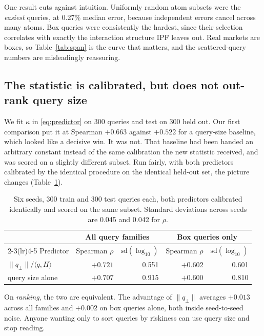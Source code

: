 \documentclass[11pt]{article}
\begin{document}
One result cuts against intuition. Uniformly random atom subsets were the
\emph{easiest} queries, at 0.27\% median error, because independent errors cancel
across many atoms. Box queries were consistently the hardest, since their
selection correlates with exactly the interaction structure IPF leaves out. Real
markets are boxes, so Table~\ref{tab:span} is the curve that matters, and the
scattered-query numbers are misleadingly reassuring.

\subsection{The statistic is calibrated, but does not out-rank query size}
\label{sec:calib}

We fit $\kappa$ in \eqref{eq:predictor} on 300 queries and test on 300 held out.
Our first comparison put it at Spearman $+0.663$ against $+0.522$ for a
query-size baseline, which looked like a decisive win. It was not. That baseline
had been handed an arbitrary constant instead of the same calibration
the new statistic received, and was scored on a slightly different subset. Run
fairly, with both predictors calibrated by the identical procedure on the
identical held-out set, the picture changes (Table~\ref{tab:predictor}).

\begin{table}[h]
\centering
\begin{tabular}{lrrrr}
\toprule
 & \multicolumn{2}{c}{All query families} & \multicolumn{2}{c}{Box queries only} \\
\cmidrule(lr){2-3}\cmidrule(lr){4-5}
Predictor & Spearman $\rho$ & $\mathrm{sd}(\log_{10})$ & Spearman $\rho$ & $\mathrm{sd}(\log_{10})$ \\
\midrule
$\lVert q_\perp\rVert / \langle q,H\rangle$ & $+0.721$ & 0.551 & $+0.602$ & 0.601 \\
query size alone                            & $+0.707$ & 0.915 & $+0.600$ & 0.810 \\
\bottomrule
\end{tabular}
\caption{Six seeds, 300 train and 300 test queries each, both predictors
calibrated identically and scored on the same subset. Standard deviations across
seeds are 0.045 and 0.042 for $\rho$.}
\label{tab:predictor}
\end{table}

On \emph{ranking}, the two are equivalent. The advantage of
$\lVert q_\perp \rVert$ averages $+0.013$ across all families and $+0.002$ on
box queries alone, both inside seed-to-seed noise. Anyone wanting only to sort
queries by riskiness can use query size and stop reading.
\end{document}
